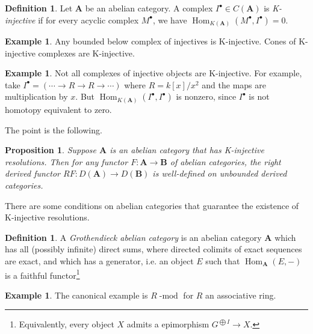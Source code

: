 \documentclass[10pt]{article}
\newtheorem{prop}[thm]{Proposition}
\theoremstyle{definition}
\newtheorem{exmp}[thm]{Example}
\newtheorem{defn}[thm]{Definition}
\DeclareMathOperator{\Hom}{Hom}
\DeclareMathOperator{\dmod}{-mod}
\newcommand{\cat}{\mathbf}
\newcommand{\todo}[1]{\textbf{\textcolor{red}{TODO #1}}}
\begin{document}
\begin{defn}
Let $\cat{A}$ be an abelian category.  A complex $I^\bullet \in C(\cat{A})$ is \emph{K-injective} if for every acyclic complex $M^\bullet$, we have $\Hom_{K(\cat{A})}(M^\bullet, I^\bullet) = 0$.
\end{defn}

\begin{exmp}
Any bounded below complex of injectives is K-injective.  Cones of K-injective complexes are K-injective.
\end{exmp}

\begin{exmp}
Not all complexes of injective objects are K-injective.  For example, take $I^\bullet = (\cdots \rightarrow R \rightarrow R \rightarrow \cdots)$ where $R = k[x]/x^2$ and the maps are multiplication by $x$.  But $\Hom_{K(\cat{A})}(I^\bullet, I^\bullet)$ is nonzero, since $I^\bullet$ is not homotopy equivalent to zero.
\end{exmp}

The point is the following.
\begin{prop}
Suppose $\cat{A}$ is an abelian category that has K-injective resolutions.  Then  for any functor $F: \cat{A} \rightarrow \cat{B}$ of abelian categories, the right derived functor $RF: D(\cat{A}) \rightarrow D(\cat{B})$ is well-defined on unbounded derived categories.
\end{prop}
%

There are some conditions on abelian categories that guarantee the existence of K-injective resolutions.
\begin{defn}
A \emph{Grothendieck abelian category} is an abelian category $\cat{A}$ which has all (possibly infinite) direct sums, where directed colimits of exact sequences are exact, and which has a generator, i.e. an object $E$ such that $\Hom_{\cat{A}}(E, -)$ is a faithful functor\footnote{Equivalently, every object $X$ admits a epimorphism $G^{\bigoplus I} \rightarrow X$.}
\end{defn}

\begin{exmp}
The canonical example is $R\dmod$ for $R$ an associative ring.
\end{exmp}
\end{document}
